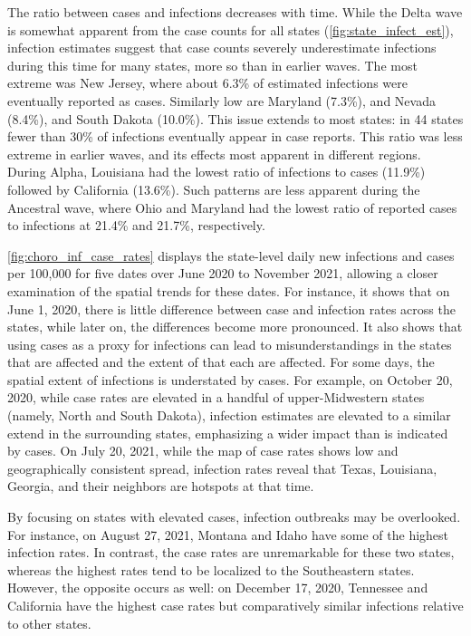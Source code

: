The ratio between cases and infections decreases with time. While the Delta wave
is somewhat apparent from the case counts for all states
(\autoref{fig:state_infect_est}), infection estimates suggest that case counts
severely underestimate infections during this time for many states, more so than
in earlier waves. The most extreme was New Jersey, where about 6.3\% of
estimated infections were eventually reported as cases. Similarly low are
Maryland (7.3\%), and Nevada (8.4\%), and South Dakota (10.0\%). This issue extends
to most states: in 44 states fewer than 30\% of infections eventually appear in
case reports. This ratio was less extreme in earlier waves, and its effects most
apparent in different regions. During Alpha, Louisiana had the lowest ratio of
infections to cases (11.9\%) followed by California (13.6\%). Such patterns are
less apparent during the Ancestral wave, where Ohio and Maryland had the
lowest ratio of reported cases to infections at 21.4\% and 21.7\%,
respectively. 

\autoref{fig:choro_inf_case_rates} displays the
state-level daily new infections and cases per 100,000 for five dates over
June 2020 to November 2021, 
allowing a closer examination of the spatial trends for these dates.
For instance, it shows that on June 1, 2020, there is little
difference between case and infection rates across the states, while later on,
the differences become more pronounced. It also shows that 
using cases as a proxy for infections can lead to misunderstandings in the 
states that are affected and the extent of that each are affected.
For some days, the spatial extent of infections is understated by
cases. For example, on October 20, 2020, while case rates are elevated in a
handful of upper-Midwestern states (namely, North and South Dakota), infection
estimates are elevated to a similar extend in the surrounding states, emphasizing a
wider impact than is indicated by cases. On July 20, 2021, while the
map of case rates shows low and geographically consistent spread, infection
rates reveal that Texas, Louisiana, Georgia, and their neighbors are hotspots at
that time. 

By focusing on states with elevated cases, infection outbreaks may be
overlooked. For instance, on August 27, 2021, Montana and Idaho have some of the
highest infection rates. In contrast, the case rates are unremarkable for these
two states, whereas the highest rates tend to be localized to the Southeastern
states. However, the opposite occurs as well: on December
17, 2020, Tennessee and California have the highest case rates but comparatively
similar  infections relative to other states.

